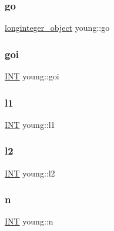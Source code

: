 \subsubsection{\texorpdfstring{go}{go}}
{\footnotesize\ttfamily \mbox{\hyperlink{classlonginteger__object}{longinteger\+\_\+object}} young\+::go}

\mbox{\label{classyoung_aebe27c292c6fefad43887f5213d78633}} 
\subsubsection{\texorpdfstring{goi}{goi}}
{\footnotesize\ttfamily \mbox{\hyperlink{galois_8h_a09fddde158a3a20bd2dcadb609de11dc}{I\+NT}} young\+::goi}

\mbox{\label{classyoung_a46b91862e7329cfd417d44c8ab5adcfa}} 
\subsubsection{\texorpdfstring{l1}{l1}}
{\footnotesize\ttfamily \mbox{\hyperlink{galois_8h_a09fddde158a3a20bd2dcadb609de11dc}{I\+NT}} young\+::l1}

\mbox{\label{classyoung_a871246c4686a1a4709a4d2b2a5f3bf15}} 
\subsubsection{\texorpdfstring{l2}{l2}}
{\footnotesize\ttfamily \mbox{\hyperlink{galois_8h_a09fddde158a3a20bd2dcadb609de11dc}{I\+NT}} young\+::l2}

\mbox{\label{classyoung_a5a4ed3dd37f08aa25476be7f065966c4}} 
\subsubsection{\texorpdfstring{n}{n}}
{\footnotesize\ttfamily \mbox{\hyperlink{galois_8h_a09fddde158a3a20bd2dcadb609de11dc}{I\+NT}} young\+::n}

\mbox{\label{classyoung_a615eccb1f4aa61671948e8e82cdbb666}} 
